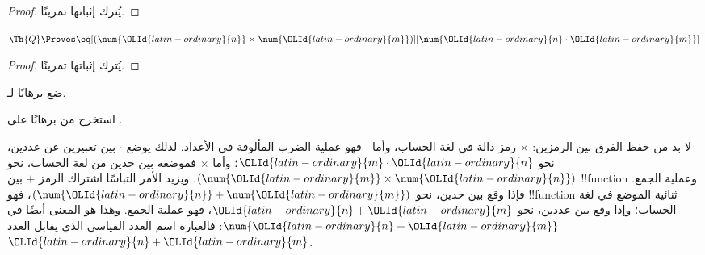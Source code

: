 \documentclass[../../../include/open-logic-section]{subfiles}
\begin{document}
\begin{proof} يُترك إثباتها تمرينًا. \end{proof}

\begin{lem}
$\Th{Q} \Proves \eq[(\num{\OLId{latin-ordinary}{n}} \times \num{\OLId{latin-ordinary}{m}})][\num{\OLId{latin-ordinary}{n} \cdot \OLId{latin-ordinary}{m}}]$
\end{lem}

\begin{proof} يُترك إثباتها تمرينًا. \end{proof}

\begin{prob}
ضع برهانًا لـ.
\end{prob}

\begin{prob}
استخرج من  برهانًا على
.
\end{prob}

\begin{explain}
  لا بد من حفظ الفرق بين الرمزين: $\times$ رمز دالة في لغة الحساب،
  وأما $\cdot$ فهو عملية الضرب المألوفة في الأعداد.
  لذلك يوضع $\cdot$ بين تعبيرين عن عددين، نحو $\OLId{latin-ordinary}{m}\cdot \OLId{latin-ordinary}{n}$؛
  وأما $\times$ فموضعه بين حدين من لغة الحساب، نحو
  $(\num{\OLId{latin-ordinary}{m}}\times\num{\OLId{latin-ordinary}{n}})$. ويزيد الأمر التباسًا اشتراك الرمز $+$
  بين !!{function} وعملية الجمع. فإذا وقع بين حدين،
  نحو $(\num{\OLId{latin-ordinary}{n}}+\num{\OLId{latin-ordinary}{m}})$، فهو !!{function} ثنائية الموضع في لغة الحساب؛
  وإذا وقع بين عددين، نحو $\OLId{latin-ordinary}{n}+\OLId{latin-ordinary}{m}$، فهو عملية الجمع.
  وهذا هو المعنى أيضًا في $\num{\OLId{latin-ordinary}{n}+\OLId{latin-ordinary}{m}}$: فالعبارة اسم العدد القياسي الذي
  يقابل العدد~$\OLId{latin-ordinary}{n}+\OLId{latin-ordinary}{m}$.
\end{explain}
\end{document}
